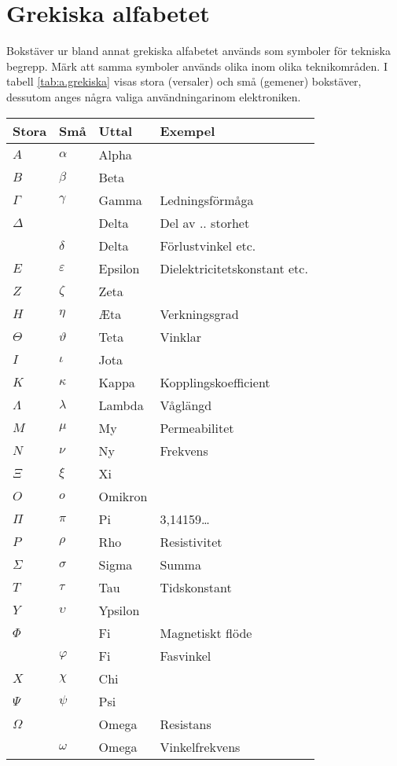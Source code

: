 \section{Grekiska alfabetet}

  Bokstäver ur bland annat grekiska alfabetet används som symboler för
  tekniska begrepp.
Märk att samma symboler används olika inom olika teknikområden. I
tabell \ref{tab:a.grekiska} visas stora (versaler) och små (gemener)
bokstäver, dessutom anges några valiga användningarinom elektroniken.

\begin{table*}
  \begin{center}
  \begin{tabular}{ll|l|l}
   Stora  & Små   & Uttal & Exempel \\
    \hline
    \(A\) & \(\alpha\) & Alpha & \\
    \(B\) & \(\beta\) & Beta & \\
    \(\Gamma\) & \(\gamma\) & Gamma & Ledningsförmåga \\
    \(\Delta\) & & Delta & Del av .. storhet \\
    & \(\delta\) & Delta & Förlustvinkel etc. \\
    \(E\) & \(\varepsilon\) & Epsilon & Dielektricitetskonstant etc.\\
    \(Z\) & \(\zeta\) & Zeta & \\
    \(H\) & \(\eta\) & \AE ta & Verkningsgrad\\
    \(\Theta\) & \(\vartheta\) & Teta & Vinklar \\
    \(I\) & \(\iota\) & Jota & \\
    \(K\) & \(\kappa\) & Kappa & Kopplingskoefficient \\
    \(\Lambda\) & \(\lambda\) & Lambda & Våglängd \\
    \(M\) & \(\mu\) & My & Permeabilitet \\
    \(N\) & \(\nu\) & Ny & Frekvens \\
    \(\Xi\) & \(\xi\) & Xi & \\
    \(O\) & \(o\) & Omikron & \\
    \(\Pi\) & \(\pi\) & Pi & 3,14159\dots \\
    \(P\) & \(\rho\) & Rho & Resistivitet \\
    \(\Sigma\) & \(\sigma\) & Sigma & Summa \\
    \(T\) & \(\tau\) & Tau & Tidskonstant \\
    \(Y\) & \(\upsilon\) & Ypsilon &  \\
    \(\Phi\) & & Fi & Magnetiskt flöde \\
    & \(\varphi\) & Fi & Fasvinkel \\
    \(X\) & \(\chi\) & Chi & \\
    \(\Psi\) & \(\psi\) & Psi & \\
    \(\Omega\) & & Omega & Resistans \\
    & \(\omega\) & Omega & Vinkelfrekvens \\
  \end{tabular}
  \caption{Grekiska alfabetet med exempel på användning i
    vetenskapliga och elektroniska sammanhang.}
  \label{tab:a.grekiska}
  \end{center}
\end{table*}

